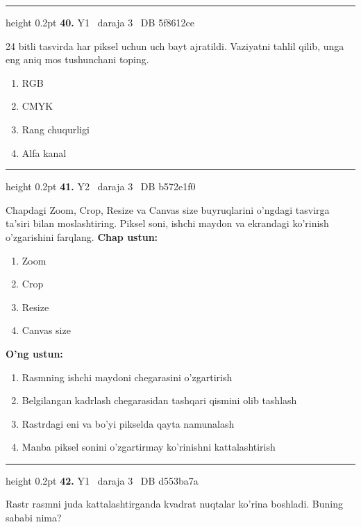 \documentclass[10pt,a4paper,oneside]{article}
\begin{document}
\vspace{2mm}\hrule height 0.2pt \vspace{4mm}
\hypertarget{q40}{\textbf{\color{ink}40.}}  {\color{muted}\scriptsize Y1 \textbullet\ daraja 3 \textbullet\ DB 5f8612ce}
\par
24 bitli tasvirda har piksel uchun uch bayt ajratildi. Vaziyatni tahlil qilib, unga eng aniq mos tushunchani toping.
\begin{enumerate}[label=\Alph*),leftmargin=9mm]
\item RGB
\item CMYK
\item Rang chuqurligi
\item Alfa kanal
\end{enumerate}
\vspace{2mm}\hrule height 0.2pt \vspace{4mm}
\hypertarget{q41}{\textbf{\color{ink}41.}}  {\color{muted}\scriptsize Y2 \textbullet\ daraja 3 \textbullet\ DB b572e1f0}
\par
Chapdagi Zoom, Crop, Resize va Canvas size buyruqlarini o'ngdagi tasvirga ta'siri bilan moslashtiring. Piksel soni, ishchi maydon va ekrandagi ko'rinish o'zgarishini farqlang.
\textbf{\footnotesize Chap ustun:}
\begin{enumerate}[label=\arabic*),leftmargin=9mm]
\item Zoom
\item Crop
\item Resize
\item Canvas size
\end{enumerate}
\textbf{\footnotesize O'ng ustun:}
\begin{enumerate}[label=\Alph*),leftmargin=9mm]
\item Rasmning ishchi maydoni chegarasini o'zgartirish
\item Belgilangan kadrlash chegarasidan tashqari qismini olib tashlash
\item Rastrdagi eni va bo'yi pikselda qayta namunalash
\item Manba piksel sonini o'zgartirmay ko'rinishni kattalashtirish
\end{enumerate}
\vspace{2mm}\hrule height 0.2pt \vspace{4mm}
\hypertarget{q42}{\textbf{\color{ink}42.}}  {\color{muted}\scriptsize Y1 \textbullet\ daraja 3 \textbullet\ DB d553ba7a}
\par
Rastr rasmni juda kattalashtirganda kvadrat nuqtalar ko'rina boshladi. Buning sababi nima?
\end{document}
